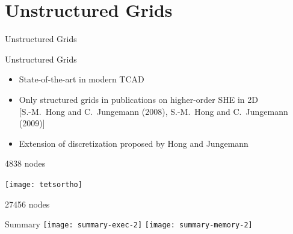 

\section{Unstructured Grids}

\begin{frame}{Unstructured Grids}
 \begin{block}{Unstructured Grids}
  \begin{itemize}
   \item State-of-the-art in modern TCAD
   \item Only structured grids in publications on higher-order SHE in 2D  \\
         \hspace{0.3cm} {\footnotesize [S.-M.~Hong and C.~Jungemann (2008), S.-M.~Hong and C.~Jungemann (2009)] }
   \item Extension of discretization proposed by Hong and Jungemann
  \end{itemize}
 \end{block}

 \begin{center}
  \begin{minipage}{0.2\textwidth}
    4838 nodes
  \end{minipage}
  \begin{minipage}{0.55\textwidth}
    \texttt{[image: tetsortho]}\ \ \\
  \end{minipage}
  \begin{minipage}{0.2\textwidth}
    27456 nodes
  \end{minipage}
 \end{center}
\end{frame}




\begin{frame}{Summary}
 \texttt{[image: summary-exec-2]}
 \texttt{[image: summary-memory-2]}
\end{frame}


